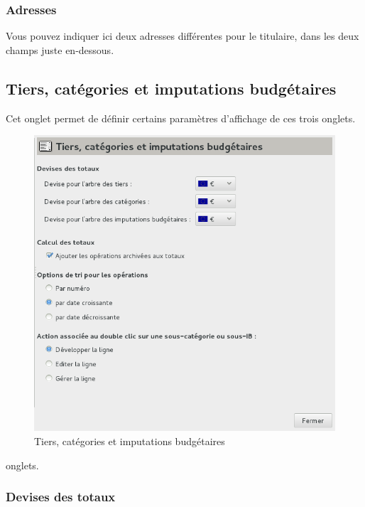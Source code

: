 \subsubsection{Adresses\label{setup-display-addresses-address}}

Vous pouvez indiquer ici deux adresses différentes pour le titulaire, dans les deux champs juste en-dessous.


\subsection{Tiers, catégories et imputations budgétaires\label{setup-display-third}}

Cet onglet permet de définir certains paramètres d'affichage de ces trois \ifIllustration onglets.
\begin{figure}[h!]
\begin{center}
\includegraphics[scale=0.5]{image/screenshot/setup_thirdCategories}
\end{center}
\caption{Tiers, catégories et imputations budgétaires}
\label{setup-thirdCategories-img}
\end{figure}
\else onglets.
\fi


\subsubsection{Devises des totaux\label{setup-display-third-currencies}}

